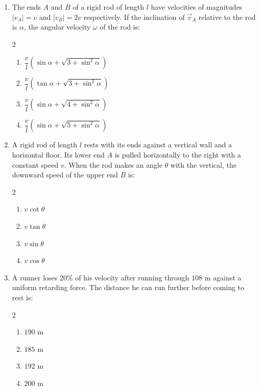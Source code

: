 \documentclass[11pt,a4paper]{article}
\begin{document}
\begin{enumerate}[label=\textbf{\textcolor{l3Crimson}{Q\arabic*.}},leftmargin=24pt,itemsep=10pt,start=51]
  \item The ends $A$ and $B$ of a rigid rod of length $l$ have velocities of magnitudes $|v_A| = v$ and $|v_B| = 2v$ respectively. If the inclination of $\vec{v}_A$ relative to the rod is $\alpha$, the angular velocity $\omega$ of the rod is:
  \begin{multicols}{2}
  \begin{enumerate}[label=\textbf{\textcolor{primaryDark}{(\Alph*)}},itemsep=2pt]
    \item $\dfrac{v}{l}\left(\sin\alpha + \sqrt{3 + \sin^2\alpha}\right)$
    \item $\dfrac{v}{l}\left(\tan\alpha + \sqrt{3 + \sin^2\alpha}\right)$
    \item $\dfrac{v}{l}\left(\sin\alpha + \sqrt{4 + \sin^2\alpha}\right)$
    \item $\dfrac{v}{l}\left(\sin\alpha + \sqrt{5 + \sin^2\alpha}\right)$
  \end{enumerate}
  \end{multicols}

  \item A rigid rod of length $l$ rests with its ends against a vertical wall and a horizontal floor. Its lower end $A$ is pulled horizontally to the right with a constant speed $v$. When the rod makes an angle $\theta$ with the vertical, the downward speed of the upper end $B$ is:
  \begin{multicols}{2}
  \begin{enumerate}[label=\textbf{\textcolor{primaryDark}{(\Alph*)}},itemsep=2pt]
    \item $v \cot\theta$
    \item $v \tan\theta$
    \item $v \sin\theta$
    \item $v \cos\theta$
  \end{enumerate}
  \end{multicols}

  \item A runner loses $20\%$ of his velocity after running through $108\text{ m}$ against a uniform retarding force. The distance he can run further before coming to rest is:
  \begin{multicols}{2}
  \begin{enumerate}[label=\textbf{\textcolor{primaryDark}{(\Alph*)}},itemsep=2pt]
    \item $190\text{ m}$
    \item $185\text{ m}$
    \item $192\text{ m}$
    \item $200\text{ m}$
  \end{enumerate}
  \end{multicols}


\end{enumerate}
\end{document}
